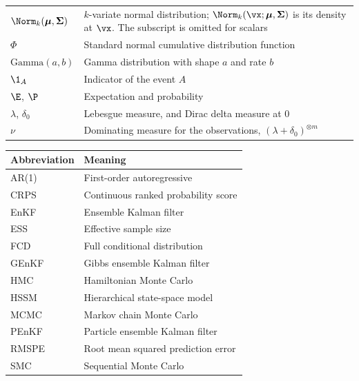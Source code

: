 \documentclass[12pt]{article}
\begin{document}
\begin{longtable}{@{}lp{}@{}}
$\Norm_k(\boldsymbol\mu, \mathbf\Sigma)$ & $k$-variate normal distribution; $\Norm_k(\vx; \boldsymbol\mu, \mathbf\Sigma)$ is its density at $\vx$. The subscript is omitted for scalars \\
$\Phi$ & Standard normal cumulative distribution function \\
$\text{Gamma}(a, b)$ & Gamma distribution with shape $a$ and rate $b$ \\
$\1_A$ & Indicator of the event $A$ \\
$\E$, $\P$ & Expectation and probability \\
$\lambda$, $\delta_0$ & Lebesgue measure, and Dirac delta measure at $0$ \\
$\nu$ & Dominating measure for the observations, $(\lambda + \delta_0)^{\otimes m}$ \\
\bottomrule
\end{longtable}

\begin{longtable}{@{}lp{}@{}}
\toprule
Abbreviation & Meaning \\
\midrule
\endhead
AR(1) & First-order autoregressive \\
CRPS & Continuous ranked probability score \\
EnKF & Ensemble Kalman filter \\
ESS & Effective sample size \\
FCD & Full conditional distribution \\
GEnKF & Gibbs ensemble Kalman filter \\
HMC & Hamiltonian Monte Carlo \\
HSSM & Hierarchical state-space model \\
MCMC & Markov chain Monte Carlo \\
PEnKF & Particle ensemble Kalman filter \\
RMSPE & Root mean squared prediction error \\
SMC & Sequential Monte Carlo \\
\bottomrule
\end{longtable}
\end{document}
